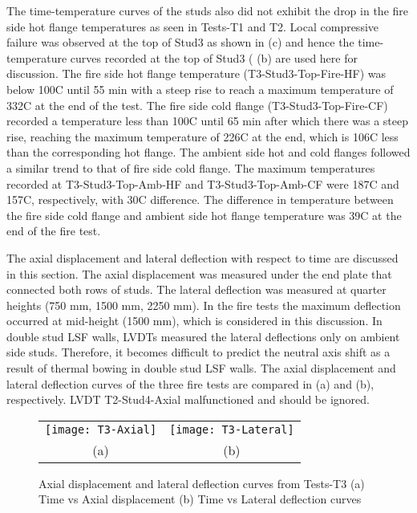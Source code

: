 The time-temperature curves of the studs also did not exhibit the drop in the fire side hot flange temperatures as seen in Tests-T1 and T2. Local compressive failure was observed at the top of Stud3 as shown in  (c) and hence the time-temperature curves recorded at the top of Stud3 ( (b) are used here for discussion. The fire side hot flange temperature (T3-Stud3-Top-Fire-HF) was below 100\degree C until 55 min with a steep rise to reach a maximum temperature of 332\degree C at the end of the test. The fire side cold flange (T3-Stud3-Top-Fire-CF) recorded a temperature less than 100\degree C until 65 min after which there was a steep rise, reaching the maximum temperature of 226\degree C at the end, which is 106\degree C less than the corresponding hot flange. The ambient side hot and cold flanges followed a similar trend to that of fire side cold flange. The maximum temperatures recorded at T3-Stud3-Top-Amb-HF and T3-Stud3-Top-Amb-CF were 187\degree C and 157\degree C, respectively, with 30\degree C difference. The difference in temperature between the fire side cold flange and ambient side hot flange temperature was 39\degree C at the end of the fire test.

The axial displacement and lateral deflection with respect to time are discussed in this section. The axial displacement was measured under the end plate that connected both rows of studs. The lateral deflection was measured at quarter heights (750 mm, 1500 mm, 2250 mm). In the fire tests the maximum deflection occurred at mid-height (1500 mm), which is considered in this discussion. In double stud LSF walls, LVDTs measured the lateral deflections only on ambient side studs. Therefore, it becomes difficult to predict the neutral axis shift as a result of thermal bowing in double stud LSF walls. The axial displacement and lateral deflection curves of the three fire tests are compared in  (a) and (b), respectively. LVDT T2-Stud4-Axial malfunctioned and should be ignored.
\begin{figure}[!htbp]
	\centering
		\begin{tabular}{cc}
			\texttt{[image: T3-Axial]} & \texttt{[image: T3-Lateral]} \\
			(a) & (b) \\
		\end{tabular} 
		\caption{Axial displacement and lateral deflection curves from Tests-T3 (a) Time vs Axial displacement (b) Time vs Lateral deflection curves}
		\label{fig:T3-Axial-Lateral}
\end{figure}


